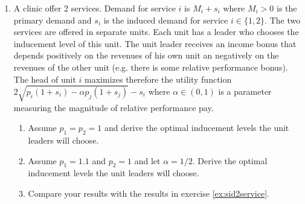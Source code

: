 \documentclass[a4paper]{article}
\begin{document}
\begin{enumerate}[resume]
\item A clinic offer 2 services. Demand for service \(i\) is \(M_i+s_i\) where \(M_i>0\) is the primary demand and \(s_i\) is the induced demand for service \(i\in\{1,2\}\). The two services are offered in separate units. Each unit has a leader who chooses the inducement level of this unit. The unit leader receives an income bonus that depends positively on the revenues of his own unit an negatively on the revenues of the other unit (e.g. there is some relative performance bonus). The head of unit \(i\) maximizes therefore the utility function \(2\sqrt{p_i(1+s_i)-\alpha p_j(1+s_j)}-s_i\) where \(\alpha\in(0,1)\) is a parameter measuring the magnitude of relative performance pay. 
\begin{enumerate}
\item Assume \(p_1=p_2=1\) and derive the optimal inducement levels the unit leaders will choose.
\item Assume \(p_1=1.1\) and \(p_2=1\) and let \(\alpha=1/2\). Derive the optimal inducement levels the unit leaders will choose.
\item Compare your results with the results in exercise \ref{ex:sid2service}.
\end{enumerate}
\end{enumerate}
\end{document}

